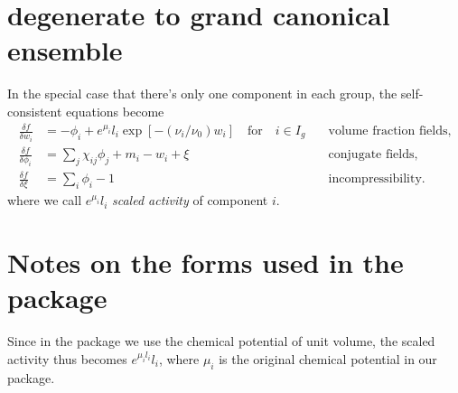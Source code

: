 \documentclass[aps,prl,reprint,onecolumn,groupedaddress,amsmath,amssymb]{revtex4-2}
\begin{document}
\section{degenerate to grand canonical ensemble}
In the special case that there's only one component in each group, the self-consistent equations become
\begin{subequations}
    \begin{align}
        \frac{\delta f}{\delta w_i}    & = -\phi_i + e^{\mu_i} l_i \exp\left[-\left(\nu_i/\nu_0\right) w_i\right]  \quad \text{for} \quad i\in I_g \quad & \text{volume fraction fields,} \\
        \frac{\delta f}{\delta \phi_i} & = \sum_j \chi_{ij} \phi_j + m_i -w_i + \xi     \quad                                                            & \text{conjugate fields,}       \\
        \frac{\delta f}{\delta \xi}    & = \sum_i \phi_i -1     \quad                                                                                    & \text{incompressibility.}
    \end{align}
\end{subequations}
where we call $e^{\mu_i} l_i$ \emph{scaled activity} of component $i$.

\section{Notes on the forms used in the package}

Since in the package we use the chemical potential of unit volume, the scaled activity thus becomes $e^{\mu_i l_i} l_i$, where $\mu_i$ is the original chemical potential in our package.
\end{document}
